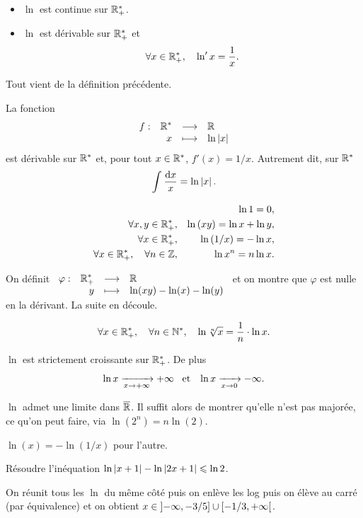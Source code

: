 \documentclass{magnolia}
\begin{document}
\begin{proposition}[utile=-3]
\begin{itemize}
\item $\ln$ est continue sur $\mathbb{R}_+^*$.
\item $\ln$ est dérivable sur $\mathbb{R}_+^*$ et
  \[\forall x\in\mathbb{R}_+^* ,\quad \ln' x=\frac{1}{x}.\]
\end{itemize}
\end{proposition}

\begin{preuve}
Tout vient de la définition précédente.
\end{preuve}

\begin{remarqueUnique}
\remarque La fonction
  \[\begin{array}[t]{lrcl} \displaystyle{f} : & \displaystyle{{\mathbb{R}^*}} & \longrightarrow & \displaystyle{\mathbb{R}} \\ & \displaystyle{x} & \longmapsto & \displaystyle{\ln\left|x\right|} \end{array}\]
  est dérivable sur ${\mathbb{R}^*}$ et, pour tout $x\in{\mathbb{R}^*}$, $f'(x)=1/x$. Autrement dit, sur ${\mathbb{R}^*}$
  \[\int_{}^{} \frac{\text{d}x}{x}=\ln\left|x\right|.\]
\end{remarqueUnique}

\begin{proposition}[utile=-3]
\begin{eqnarray*}
                   & & \ln 1=0,\\
\forall x,y\in\mathbb{R}_+^*, & & \ln\left(xy\right)=\ln x+\ln y,\\
\forall x\in\mathbb{R}_+^*, & & \ln\left(1/x\right)=-\ln x,\\
\forall x\in\mathbb{R}_+^* ,\quad \forall n\in\mathbb{Z}, & & \ln x^n=n\ln x.
\end{eqnarray*}
\end{proposition}

\begin{preuve}
On définit $\begin{array}[t]{lrcl} \displaystyle{\varphi} : & \displaystyle{\mathbb{R}_+^*} & \longrightarrow & \displaystyle{\mathbb{R}} \\ & \displaystyle{y} & \longmapsto & \displaystyle{\ln(xy)-\ln(x)-\ln(y)} \end{array}$ et on montre que $\varphi$ est nulle en la dérivant.
La suite en découle.
\end{preuve}

\begin{proposition}[utile=-3]
\[\forall x\in\mathbb{R}_+^* ,\quad \forall n\in{\mathbb{N}^*} ,\quad
  \ln\sqrt[n]{x}=\frac{1}{n}\cdot\ln x.\]
\end{proposition}

\begin{proposition}[utile=-3]
$\ln$ est strictement croissante sur $\mathbb{R}_+^*$. De plus
\[\ln x \xrightarrow[x\rightarrow +\infty]{} +\infty \quad\!\text{et}\quad\!
  \ln x \xrightarrow[x\rightarrow 0]{} -\infty.\]
\end{proposition}

\begin{preuve}
$\ln$ admet une limite dans $\overline{\mathbb{R}}$. Il suffit alors de montrer qu'elle n'est pas majorée, ce qu'on peut faire, via $\ln(2^n)=n\ln(2)$.

$\ln(x)=-\ln(1/x)$ pour l'autre.
\end{preuve}
\begin{exoUnique}
\exemple Résoudre l'inéquation $\ln\left|x+1\right|-\ln\left|2x+1\right|\leqslant\ln 2$.
  \begin{sol}
On réunit tous les $\ln$ du même côté puis on enlève les log puis on élève au carré (par équivalence) et on obtient $x\in\left]-\infty,-3/5\right]\cup\left[-1/3,+\infty\right[$. 
  \end{sol}
\end{exoUnique}
\end{document}
